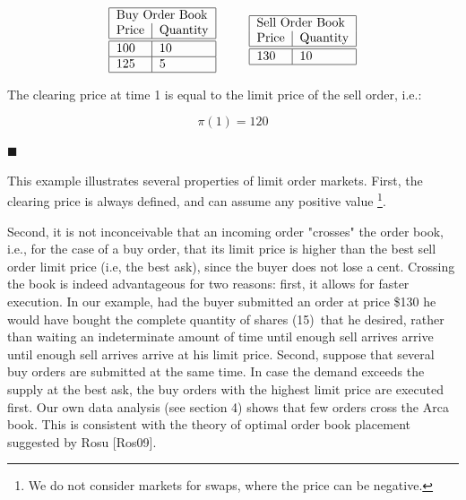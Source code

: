 \documentclass{article}
\begin{document}
\begin{equation*}
\begin{tabular}{|l|l|}
\hline
\multicolumn{2}{|l|}{Buy Order Book} \\
Price & Quantity \\ \hline\hline
100 & 10 \\ \hline
125 & 5 \\ \hline
\end{tabular}%
\text{ \ \ \ \ \ }%
\begin{tabular}{|l|l|}
\hline
\multicolumn{2}{|l|}{Sell Order Book} \\
Price & Quantity \\ \hline\hline
130 & 10 \\ \hline
\end{tabular}%
\end{equation*}

The clearing price at time 1 is equal to the limit price of the sell order,
i.e.:

\begin{equation*}
\pi (1)=120
\end{equation*}

$\blacksquare $

This example illustrates several properties of limit order markets. First,
the clearing price is always defined, and can assume any positive value%
\footnote{%
We do not consider markets for swaps, where the price can be negative.}.

Second, it is not inconceivable that an incoming order "crosses" the order
book, i.e., for the case of a buy order, that its limit price is higher than
the best sell order limit price (i.e, the best ask), since the buyer does
not lose a cent. Crossing the book is indeed advantageous for two reasons:
first, it allows for faster execution. In our example, had the buyer
submitted an order at price \$130 he would have bought the complete quantity
of shares (15)\ that he desired, rather than waiting an indeterminate amount
of time until enough sell arrives arrive until enough sell arrives arrive at
his limit price. Second, suppose that several buy orders are submitted at
the same time. In case the demand exceeds the supply at the best ask, the
buy orders with the highest limit price are executed first. Our own data
analysis (see section 4) shows that few orders cross the Arca book. This is
consistent with the theory of optimal order book placement suggested by Rosu
[Ros09].

\bigskip
\end{document}
